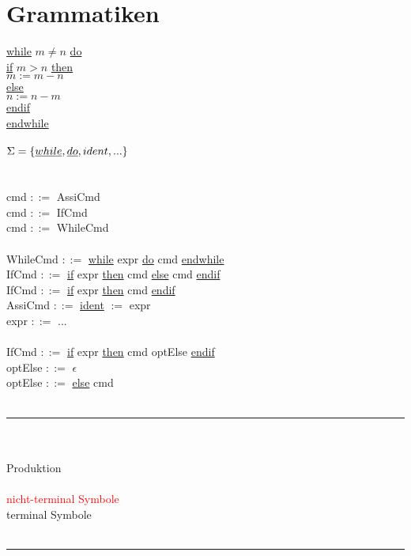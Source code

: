 \documentclass[18pt,a4paper]{scrreprt}
\newcommand{\tab}{\hspace*{2em}}
\begin{document}
\section{Grammatiken}


\uline{while} $m \neq n$ \uline{do}\\
\tab \uline{if} $m > n$ \uline{then}\\
\tab \tab $m := m-n$\\
\tab \uline{else}\\
\tab \tab $n := n-m$\\
\tab \uline{endif}\\
\uline{endwhile}\\
\\
$\Sigma = \{ \uline{while}, \uline{do}, ident, ... \}$\\
\\
\\
cmd $::=$ AssiCmd\\
cmd $::=$ IfCmd\\
cmd $::=$ WhileCmd\\
\\
WhileCmd $::=$ \uline{while} expr \uline{do} cmd \uline{endwhile}\\
IfCmd \tab $::=$ \uline{if} expr \uline{then} cmd \uline{else} cmd \uline{endif}\\
IfCmd \tab $::=$ \uline{if} expr \uline{then} cmd \uline{endif}\\
AssiCmd \:\: $::=$ \uline{ident} $:=$ expr\\
expr \tab\:\: $::=$ ...\\
\\
IfCmd \: $::=$ \uline{if} expr \uline{then} cmd optElse \uline{endif}\\
optElse $::=$ $\epsilon$\\
optElse $::=$ \uline{else} cmd\\
\\
\rule{\textwidth}{0.4mm}\\
\\
 \tab Produktion\\
\\
\textcolor{red}{nicht-terminal Symbole}\\
terminal Symbole\\
\\
\rule{\textwidth}{0.4mm}\\
\end{document}
